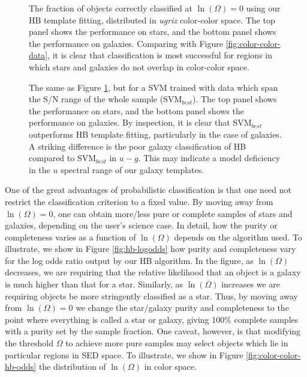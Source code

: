 \documentclass[12pt,preprint]{aastex}
\begin{document}
\begin{figure}
\centering
\caption{The fraction of objects correctly classified at
  $\ln(\Omega)=0$ using our HB template fitting, distributed in {\it
    ugriz} color-color space.  The top panel shows the performance on stars, and the bottom panel shows the performance on galaxies.  Comparing with Figure
  \ref{fig:color-color-data}, it is clear that classification is most
  successful for regions in which stars and galaxies do not overlap in
  color-color space.}
\label{fig:color-color-hb-fraction}
\end{figure}

\begin{figure}
\centering
\caption{The same as Figure \ref{fig:color-color-hb-fraction}, but for
  a SVM trained with data which span the S/N range of the whole sample
  (SVM$_{best}$).    The top panel shows the performance on stars, and the bottom panel shows the performance on galaxies.  By inspection, it is clear that SVM$_{best}$
  outperforms HB template fitting, particularly in the case of
  galaxies.  A striking difference is the poor galaxy classification
  of HB compared to SVM$_{best}$ in $u-g$.  This may indicate a model
  deficiency in the $u$ spectral range of our galaxy templates.}
\label{fig:color-color-svm-fraction}
\end{figure}


One of the great advantages of probabilistic classification is that
one need not restrict the classification criterion to a fixed value.
By moving away from $\ln(\Omega)=0$, one can obtain more/less pure or
complete samples of stars and galaxies, depending on the user's
science case.  In detail, how the purity or completeness varies as a
function of $\ln(\Omega)$ depends on the algorithm used.  To
illustrate, we show in Figure \ref{fig:hb-logodds} how purity and
completeness vary for the log odds ratio output by our HB algorithm.
In the figure, as $\ln(\Omega)$ decreases, we are requiring that the
relative likelihood that an object is a galaxy is much higher than
that for a star.  Similarly, as $\ln(\Omega)$ increases we are
requiring objects be more stringently classified as a star.  Thus, by
moving away from $\ln(\Omega)=0$ we change the star/galaxy purity and
completeness to the point where everything is called a star or galaxy,
giving 100\% complete samples with a purity set by the sample
fraction.  One caveat, however, is that modifying the threshold
$\Omega$ to achieve more pure samples may select objects which lie in
particular regions in SED space.  To illustrate, we show in Figure
\ref{fig:color-color-hb-odds} the distribution of $\ln(\Omega)$ in
color space.
\end{document}

